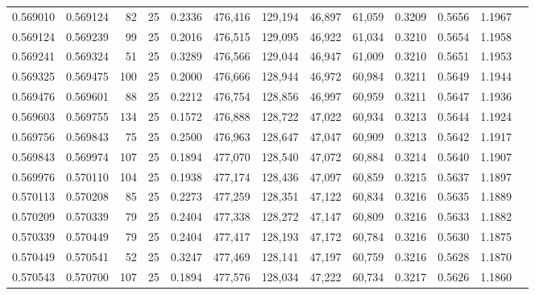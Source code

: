 \begin{tabular}{rrrrrrrrrrrrr}
0.569010 & 0.569124 &    82 &  25 &                                     0.2336 & 476,416 & 129,194 &  46,897 &  61,059 & 0.3209 & 0.5656 & 1.1967 \\
0.569124 & 0.569239 &    99 &  25 &                                     0.2016 & 476,515 & 129,095 &  46,922 &  61,034 & 0.3210 & 0.5654 & 1.1958 \\
0.569241 & 0.569324 &    51 &  25 &                                     0.3289 & 476,566 & 129,044 &  46,947 &  61,009 & 0.3210 & 0.5651 & 1.1953 \\
0.569325 & 0.569475 &   100 &  25 &                                     0.2000 & 476,666 & 128,944 &  46,972 &  60,984 & 0.3211 & 0.5649 & 1.1944 \\
0.569476 & 0.569601 &    88 &  25 &                                     0.2212 & 476,754 & 128,856 &  46,997 &  60,959 & 0.3211 & 0.5647 & 1.1936 \\
0.569603 & 0.569755 &   134 &  25 &                                     0.1572 & 476,888 & 128,722 &  47,022 &  60,934 & 0.3213 & 0.5644 & 1.1924 \\
0.569756 & 0.569843 &    75 &  25 &                                     0.2500 & 476,963 & 128,647 &  47,047 &  60,909 & 0.3213 & 0.5642 & 1.1917 \\
0.569843 & 0.569974 &   107 &  25 &                                     0.1894 & 477,070 & 128,540 &  47,072 &  60,884 & 0.3214 & 0.5640 & 1.1907 \\
0.569976 & 0.570110 &   104 &  25 &                                     0.1938 & 477,174 & 128,436 &  47,097 &  60,859 & 0.3215 & 0.5637 & 1.1897 \\
0.570113 & 0.570208 &    85 &  25 &                                     0.2273 & 477,259 & 128,351 &  47,122 &  60,834 & 0.3216 & 0.5635 & 1.1889 \\
0.570209 & 0.570339 &    79 &  25 &                                     0.2404 & 477,338 & 128,272 &  47,147 &  60,809 & 0.3216 & 0.5633 & 1.1882 \\
0.570339 & 0.570449 &    79 &  25 &                                     0.2404 & 477,417 & 128,193 &  47,172 &  60,784 & 0.3216 & 0.5630 & 1.1875 \\
0.570449 & 0.570541 &    52 &  25 &                                     0.3247 & 477,469 & 128,141 &  47,197 &  60,759 & 0.3216 & 0.5628 & 1.1870 \\
0.570543 & 0.570700 &   107 &  25 &                                     0.1894 & 477,576 & 128,034 &  47,222 &  60,734 & 0.3217 & 0.5626 & 1.1860 \\

\end{tabular}
